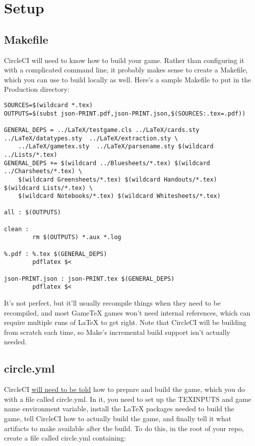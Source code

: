 \documentclass[green]{testgame}
\begin{document}
\section{Setup}

\subsection{Makefile}

CircleCI will need to know how to build your game. Rather than configuring it with a complicated command line, it probably makes sense to create a Makefile, which you can use to build locally as well. Here's a sample Makefile to put in the Production directory:

\begin{verbatim}
SOURCES=$(wildcard *.tex)
OUTPUTS=$(subst json-PRINT.pdf,json-PRINT.json,$(SOURCES:.tex=.pdf))

GENERAL_DEPS = ../LaTeX/testgame.cls ../LaTeX/cards.sty  ../LaTeX/datatypes.sty  ../LaTeX/extraction.sty \
    ../LaTeX/gametex.sty  ../LaTeX/parsename.sty $(wildcard ../Lists/*.tex)
GENERAL_DEPS += $(wildcard ../Bluesheets/*.tex) $(wildcard ../Charsheets/*.tex) \
    $(wildcard Greensheets/*.tex) $(wildcard Handouts/*.tex) $(wildcard Lists/*.tex) \
    $(wildcard Notebooks/*.tex) $(wildcard Whitesheets/*.tex)

all : $(OUTPUTS)

clean :
        rm $(OUTPUTS) *.aux *.log

%.pdf : %.tex $(GENERAL_DEPS)
        pdflatex $<

json-PRINT.json : json-PRINT.tex $(GENERAL_DEPS)
        pdflatex $<
\end{verbatim}

It's not perfect, but it'll usually recompile things when they need to be recompiled, and most GameTeX games won't need internal references, which can require multiple runs of \LaTeX{} to get right. Note that CircleCI will be building from scratch each time, so Make's incremental build support isn't actually needed.

\subsection{circle.yml}

CircleCI \href{https://circleci.com/docs/configuration/}{will need to be told} how to prepare and build the game, which you do with a file called circle.yml. In it, you need to set up the TEXINPUTS and game name environment variable, install the LaTeX packages needed to build the game, tell CircleCI how to actually build the game, and finally tell it what artifacts to make available after the build. To do this, in the root of your repo, create a file called circle.yml containing:
\end{document}
